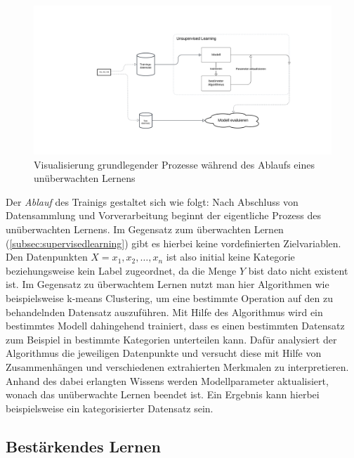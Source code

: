 \begin{figure}[H]\label{img:unsupervisedworkflow}
	\hspace{-15mm}
	\centering
	\includegraphics[width=0.8\linewidth]{Bilder/UnsupervisedLearning.png}
	\caption{Visualisierung grundlegender Prozesse während des Ablaufs eines unüberwachten Lernens}
\end{figure}
Der \textit{Ablauf} des Trainigs gestaltet sich wie folgt: Nach Abschluss von Datensammlung und Vorverarbeitung beginnt der eigentliche Prozess des unüberwachten Lernens. Im Gegensatz zum überwachten Lernen (\ref{subsec:supervisedlearning}) gibt es hierbei keine vordefinierten Zielvariablen. Den Datenpunkten $X = x_1, x_2, \ldots, x_n$ ist also initial keine Kategorie beziehungsweise kein Label zugeordnet, da die Menge $Y$ bist dato nicht existent ist. Im Gegensatz zu überwachtem Lernen nutzt man hier Algorithmen wie beispielsweise k-means Clustering, um eine bestimmte Operation auf den zu behandelnden Datensatz auszuführen. Mit Hilfe des Algorithmus wird ein bestimmtes Modell dahingehend trainiert, dass es einen bestimmten Datensatz zum Beispiel in bestimmte Kategorien unterteilen kann. Dafür analysiert der Algorithmus die jeweiligen Datenpunkte und versucht diese mit Hilfe von Zusammenhängen und verschiedenen extrahierten Merkmalen zu interpretieren. Anhand des dabei erlangten Wissens werden Modellparameter aktualisiert, wonach das unüberwachte Lernen beendet ist. Ein Ergebnis kann hierbei beispielsweise ein kategorisierter Datensatz sein.
\subsection{Bestärkendes Lernen}